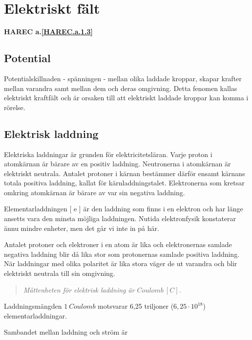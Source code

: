 \section{Elektriskt fält}
\textbf{HAREC a.\ref{HAREC.a.1.3}\label{myHAREC.a.1.3}}
\label{elektriskafält}

\subsection{Potential}

Potentialskillnaden - spänningen - mellan olika laddade kroppar, skapar krafter
mellan varandra samt mellan dem och deras omgivning. Detta fenomen kallas
elektriskt kraftfält och är orsaken till att elektriskt laddade kroppar kan
komma i rörelse.

\subsection{Elektrisk laddning}

Elektriska laddningar är grunden för elektricitetsläran. Varje proton i
atomkärnan är bärare av en positiv laddning. Neutronerna i atomkärnan är
elektriskt neutrala. Antalet protoner i kärnan bestämmer därför ensamt kärnans
totala positiva laddning, kallat för kärnladdningstalet. Elektronerna som
kretsar omkring atomkärnan är bärare av var sin negativa laddning.

Elementarladdningen [ e ] är den laddning som finns i en elektron och har länge
ansetts vara den minsta möjliga laddningen. Nutida elektronfysik konstaterar
ännu mindre enheter, men det går vi inte in på här.

Antalet protoner och elektroner i en atom är lika och elektronernas samlade
negativa laddning blir då lika stor som protonernas samlade positiva laddning.
När laddningar med olika polaritet är lika stora väger de ut varandra och blir
elektriskt neutrala till sin omgivning.

\begin{quote}\emph{
Måttenheten för elektrisk laddning är \(Coulomb\ [C]\).
}\end{quote}

Laddningsmängden \(1\ Coulomb\) motsvarar 6,25 triljoner (\(6,25\cdot10^{18}\))
elementarladdningar.

Sambandet mellan laddning och ström är

